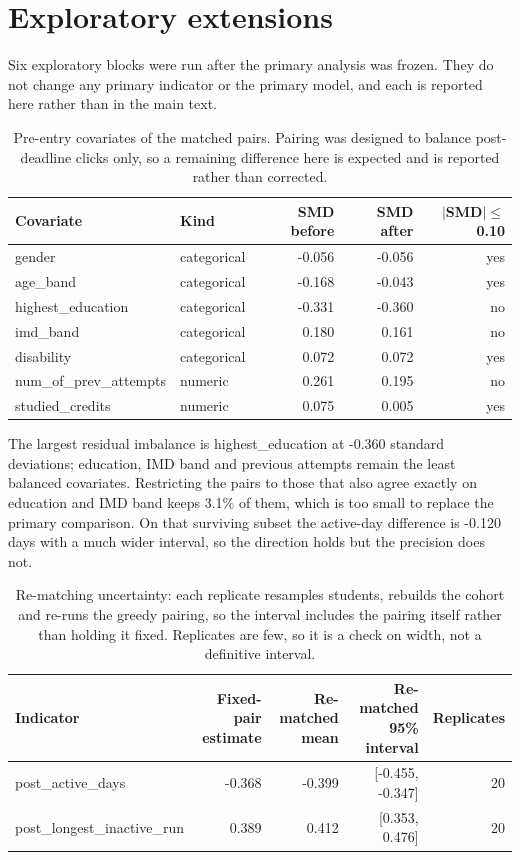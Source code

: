 \documentclass[11pt]{article}
\begin{document}
\section{Exploratory extensions}
Six exploratory blocks were run after the primary analysis was frozen. They do not change any primary indicator or the primary model, and each is reported here rather than in the main text.
\begin{table}[t]
\centering
\footnotesize
\begin{tabular}{llrrr}
\toprule
Covariate & Kind & SMD before & SMD after & $|$SMD$|\le$0.10 \\
\midrule
gender & categorical & -0.056 & -0.056 & yes \\
age\_band & categorical & -0.168 & -0.043 & yes \\
highest\_education & categorical & -0.331 & -0.360 & no \\
imd\_band & categorical & 0.180 & 0.161 & no \\
disability & categorical & 0.072 & 0.072 & yes \\
num\_of\_prev\_attempts & numeric & 0.261 & 0.195 & no \\
studied\_credits & numeric & 0.075 & 0.005 & yes \\
\bottomrule
\end{tabular}
\caption{Pre-entry covariates of the matched pairs. Pairing was designed to balance post-deadline clicks only, so a remaining difference here is expected and is reported rather than corrected.}
\label{tab:c1}
\end{table}
The largest residual imbalance is highest\_education at -0.360 standard deviations; education, IMD band and previous attempts remain the least balanced covariates. Restricting the pairs to those that also agree exactly on education and IMD band keeps 3.1\% of them, which is too small to replace the primary comparison.
On that surviving subset the active-day difference is -0.120 days with a much wider interval, so the direction holds but the precision does not.
\begin{table}[t]
\centering
\footnotesize
\begin{tabular}{lrrrr}
\toprule
Indicator & Fixed-pair estimate & Re-matched mean & Re-matched 95\% interval & Replicates \\
\midrule
post\_active\_days & -0.368 & -0.399 & [-0.455, -0.347] & 20 \\
post\_longest\_inactive\_run & 0.389 & 0.412 & [0.353, 0.476] & 20 \\
\bottomrule
\end{tabular}
\caption{Re-matching uncertainty: each replicate resamples students, rebuilds the cohort and re-runs the greedy pairing, so the interval includes the pairing itself rather than holding it fixed. Replicates are few, so it is a check on width, not a definitive interval.}
\label{tab:c2}
\end{table}
\end{document}
